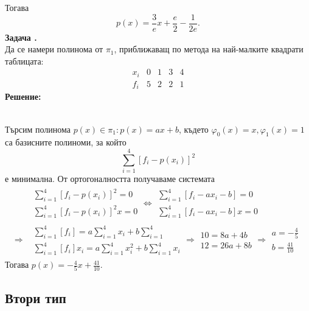 \documentclass[12pt]{article}
\newcounter{problem}
\newcounter{solution}
\newcommand\problem{%
  \stepcounter{problem}%
  \textbf{Задача \theproblem.}~%
  \\
}
\newcommand\solution{%
  \textbf{Решение:}\\~%
}
\begin{document}
Тогава
\begin{equation*}
\boxed{p(x) = \frac{3}{e}x + \frac{e}{2} - \frac{1}{2e}}.
\end{equation*}
\problem
Да се намери полинома от $\pi_1$, приближаващ по метода на най-малките квадрати таблицата:
\begin{equation*}
\begin{array}{c|c|c|c|c|}
x_i & 0 & 1 & 3 & 4\\
\hline
f_i & 5 & 2 & 2 & 1
\end{array}
\end{equation*}
\solution
Търсим полинома $p(x) \in \pi_1:p(x) =ax+b$, където $\varphi_0(x) = x, \varphi_1(x) = 1$ са базисните полиноми, за който 
\begin{equation*}
\sum_{i=1}^{4}[f_i-p(x_i)]^2
\end{equation*}
е минимална.
От ортогоналността получаваме системата
\begin{align*}
&\begin{array}{|c}
\sum_{i=1}^{4}[f_i-p(x_i)]^2 = 0\\
\sum_{i=1}^{4}[f_i-p(x_i)]^2x=0
\end{array}
\Leftrightarrow
\begin{array}{|c}
\sum_{i=1}^{4}[f_i-ax_i-b] = 0\\
\sum_{i=1}^{4}[f_i-ax_i-b]x=0
\end{array}\\
\Rightarrow
&\begin{array}{|c}
\sum_{i=1}^{4}[f_i] =a\sum_{i=1}^{4}x_i+b\sum_{i=1}^{4}\\
\sum_{i=1}^{4}[f_i]x_i=a\sum_{i=1}^{4}x_i^2 + b\sum_{i=1}^{4}x_i
\end{array}
\Rightarrow
\begin{array}{|c}
10 = 8a + 4b\\
12 = 26a + 8b
\end{array}
\Rightarrow
\boxed{
\begin{array}{|c}
a = -\frac{4}{5}\\
b = \frac{41}{10}
\end{array}}
\end{align*}
Тогава $p(x) = -\frac{4}{5}x+\frac{41}{10}$.\\
\begin{center}{\section*{Втори тип}}\end{center}
\setcounter{problem}{6}
\end{document}
